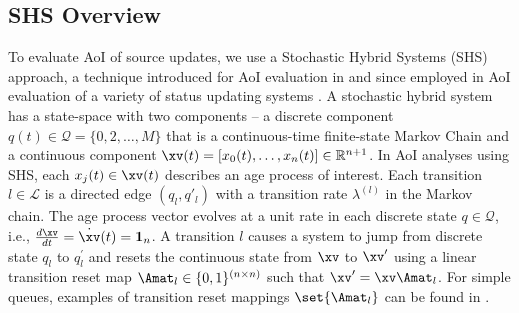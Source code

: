 \documentclass[conference, 10pt]{IEEEtran}
\newcommand{\Lcal}{\mathcal{L}}
\newcommand{\Qcal}{\mathcal{Q}}
\newcommand{\R}{\mathbb{R}}
\newcommand{\laml}[1][l]{\lambda^{(#1)}}
\newcommand{\onev}[1][n]{{\mathbf{1}}_{#1}}
\begin{document}
\subsection{SHS Overview}
To evaluate AoI of source updates, we use a Stochastic Hybrid Systems (SHS)~\cite{hespanha2006modelling} approach,  a technique introduced for AoI evaluation in \cite{yates2018ToIT} and since employed in AoI evaluation of a variety of status updating systems \cite{Yates-aoi2018,Farazi-KB-aoi2018,Maatouk-AE-aoi2019,Kaul-Yates-isit2018priority,Maatouk-AE-ToN2020,Yates-IT2020,Moltafet-LC-CommLetters2021,Moltafet-LC-ISWCS2021}.
A stochastic hybrid system has a state-space with two components -- a  discrete component $q(t) \in \Qcal = \{0, 2, \ldots, M\}$ that is a continuous-time finite-state Markov Chain and a continuous component $\xv(t) = [x_0(t), \ldots , x_n(t)] \in \R^{n+1}$. In AoI analyses using SHS, each $x_{j}(t) \in \xv(t)$ describes an age process of interest. Each transition $l \in \Lcal$ is a directed edge $(q_l, q'_l)$ with a transition rate $\laml$ in the Markov chain. The age process vector evolves at a unit rate in each discrete state $q \in \Qcal$, i.e., $\frac{d\xv}{dt} = \dot{\xv}(t) = \onev$. A transition $l$ causes a system to jump from discrete state $q_l$ to $q_l^\prime$ and resets the continuous state from $\xv$ to $\xv'$ using a linear transition reset map $\Amat_l \in \{0,1\}^{(n \times n)}$ such that $\xv' = \xv \Amat_l$. For simple queues, examples of transition reset mappings $\set{\Amat_l}$  can be found in \cite{yates2018ToIT}.
\end{document}
